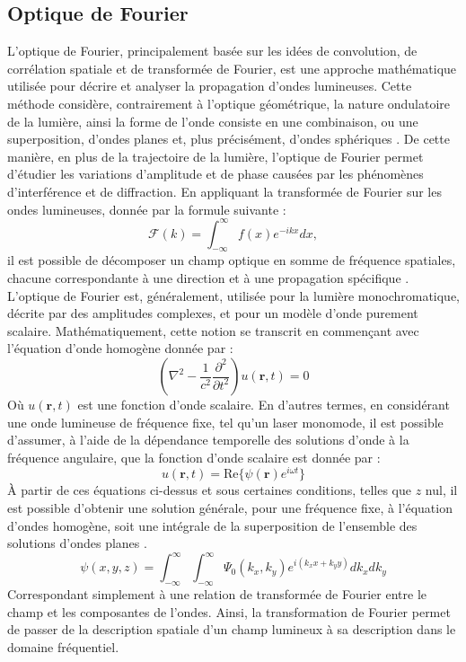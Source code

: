 \documentclass[11pt,letterpaper]{article}
\begin{document}
\subsection{Optique de Fourier}\label{Fourier_optic}
L'optique de Fourier, principalement basée sur les idées de convolution, de corrélation spatiale et de transformée de Fourier, est une approche mathématique utilisée pour décrire et analyser la propagation d'ondes lumineuses. Cette méthode considère, contrairement à l'optique géométrique, la nature ondulatoire de la lumière, ainsi la forme de l'onde consiste en une combinaison, ou une superposition, d'ondes planes et, plus précisément, d'ondes sphériques \cite{paschotta_fourier_2024}. De cette manière, en plus de la trajectoire de la lumière, l'optique de Fourier permet d'étudier les variations d'amplitude et de phase causées par les phénomènes d'interférence et de diffraction. En appliquant la transformée de Fourier sur les ondes lumineuses, donnée par la formule suivante :
\begin{equation}
  \mathcal{F}(k)=\int_{-\infty}^{\infty}f(x)e^{-ikx}dx,
\end{equation}
il est possible de décomposer un champ optique en somme de fréquence spatiales, chacune correspondante à une direction et à une propagation spécifique \cite{noauthor_fourier_2024}. L'optique de Fourier est, généralement, utilisée pour la lumière monochromatique, décrite  par des amplitudes complexes, et pour un modèle d'onde purement scalaire. Mathématiquement, cette notion se transcrit en commençant avec l'équation d'onde homogène donnée par :
\begin{equation}
  \left(\nabla^{2}-\frac{1}{c^{2}}\frac{\partial^{2}}{\partial t^{2}}\right)u(\mathbf{r}, t)=0
\end{equation}
Où $u(\mathbf{r}, t)$ est une fonction d'onde scalaire. En d'autres termes, en considérant une onde lumineuse de fréquence fixe, tel qu'un laser monomode, il est possible d'assumer, à l'aide de la dépendance temporelle des solutions d'onde à la fréquence angulaire, que la fonction d'onde scalaire est donnée par :
\begin{equation}
  u(\mathbf{r}, t)=\mathrm{Re}\{\psi(\mathbf{r})e^{i\omega t}\}
\end{equation}
À partir de ces équations ci-dessus et sous certaines conditions, telles que $z$ nul, il est possible d'obtenir une solution générale, pour une fréquence fixe, à l'équation d'ondes homogène, soit une intégrale de la superposition de l'ensemble des solutions d'ondes planes \cite{noauthor_fourier_2024-1}.
\begin{equation}
  \psi(x, y, z)=\int_{-\infty}^{\infty}\int_{-\infty}^{\infty}\Psi_{0}(k_{x},k_{y})e^{i(k_{x}x+k_{y}y)}dk_{x}dk_{y}
\end{equation}
Correspondant simplement à une relation de transformée de Fourier entre le champ et les composantes de l'ondes. Ainsi, la transformation de Fourier permet de passer de la description spatiale d’un champ lumineux à sa description dans le domaine fréquentiel.
\end{document}
